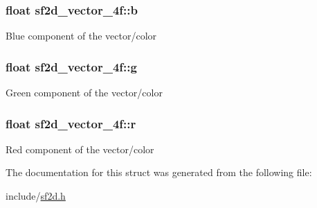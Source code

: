 \subsubsection[{b}]{\setlength{\rightskip}{0pt plus 5cm}float sf2d\+\_\+vector\+\_\+4f\+::b}\label{structsf2d__vector__4f_a086d3a04d19322849a3ffa1e01f18c41}
Blue component of the vector/color \hypertarget{structsf2d__vector__4f_a1c6ed8a78238cc48834cfdd3022efa3c}{}
\subsubsection[{g}]{\setlength{\rightskip}{0pt plus 5cm}float sf2d\+\_\+vector\+\_\+4f\+::g}\label{structsf2d__vector__4f_a1c6ed8a78238cc48834cfdd3022efa3c}
Green component of the vector/color \hypertarget{structsf2d__vector__4f_a9b6406bf98af7640a13a9027b64c7b04}{}
\subsubsection[{r}]{\setlength{\rightskip}{0pt plus 5cm}float sf2d\+\_\+vector\+\_\+4f\+::r}\label{structsf2d__vector__4f_a9b6406bf98af7640a13a9027b64c7b04}
Red component of the vector/color 

The documentation for this struct was generated from the following file\+:\begin{DoxyCompactItemize}
\item 
include/\hyperlink{sf2d_8h}{sf2d.\+h}\end{DoxyCompactItemize}
